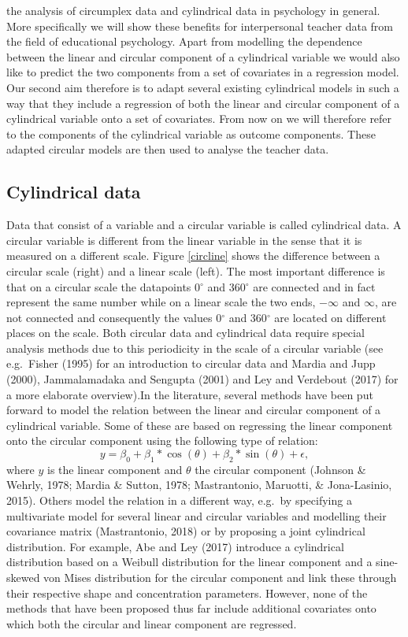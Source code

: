 \documentclass[man]{apa6}
\theoremstyle{definition}
\theoremstyle{definition}
\theoremstyle{definition}
\theoremstyle{remark}
\begin{document}
the analysis of circumplex data and cylindrical data in psychology in
general. More specifically we will show these benefits for interpersonal
teacher data from the field of educational psychology. Apart from
modelling the dependence between the linear and circular component of a
cylindrical variable we would also like to predict the two components
from a set of covariates in a regression model. Our second aim therefore
is to adapt several existing cylindrical models in such a way that they
include a regression of both the linear and circular component of a
cylindrical variable onto a set of covariates. From now on we will
therefore refer to the components of the cylindrical variable as outcome
components. These adapted circular models are then used to analyse the
teacher data.

\subsection{Cylindrical data}

Data that consist of a variable and a circular variable is called
cylindrical data. A circular variable is different from the linear
variable in the sense that it is measured on a different scale. Figure
\ref{circline} shows the difference between a circular scale (right) and
a linear scale (left). The most important difference is that on a
circular scale the datapoints 0\(^\circ\) and 360\(^\circ\) are
connected and in fact represent the same number while on a linear scale
the two ends, \(-\infty\) and \(\infty\), are not connected and
consequently the values 0\(^\circ\) and 360\(^\circ\) are located on
different places on the scale. Both circular data and cylindrical data
require special analysis methods due to this periodicity in the scale of
a circular variable (see e.g.~Fisher (1995) for an introduction to
circular data and Mardia and Jupp (2000), Jammalamadaka and Sengupta
(2001) and Ley and Verdebout (2017) for a more elaborate
overview).\newline \indent In the literature, several methods have been
put forward to model the relation between the linear and circular
component of a cylindrical variable. Some of these are based on
regressing the linear component onto the circular component using the
following type of relation: \[y = \beta_0 +
\beta_1*\cos(\theta) + \beta_2*\sin(\theta)+ \epsilon,\] where \(y\) is
the linear component and \(\theta\) the circular component (Johnson \&
Wehrly, 1978; Mardia \& Sutton, 1978; Mastrantonio, Maruotti, \&
Jona-Lasinio, 2015). Others model the relation in a different way,
e.g.~by specifying a multivariate model for several linear and circular
variables and modelling their covariance matrix (Mastrantonio, 2018) or
by proposing a joint cylindrical distribution. For example, Abe and Ley
(2017) introduce a cylindrical distribution based on a Weibull
distribution for the linear component and a sine-skewed von Mises
distribution for the circular component and link these through their
respective shape and concentration parameters. However, none of the
methods that have been proposed thus far include additional covariates
onto which both the circular and linear component are regressed.
\end{document}

